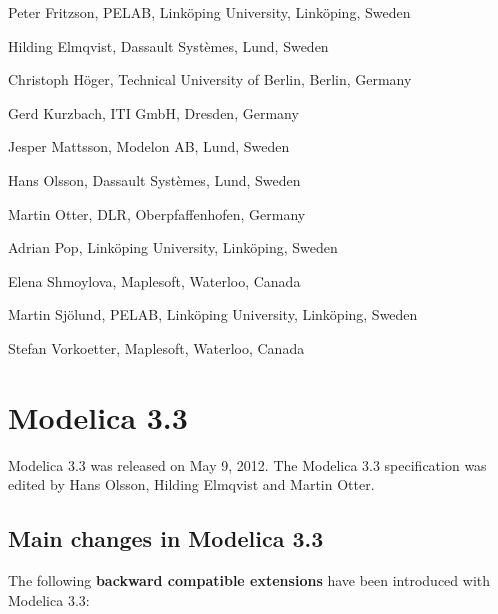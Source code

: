 Peter Fritzson, PELAB, Linköping University, Linköping, Sweden

Hilding Elmqvist, Dassault Systèmes, Lund, Sweden

Christoph Höger, Technical University of Berlin, Berlin, Germany

Gerd Kurzbach, ITI GmbH, Dresden, Germany

Jesper Mattsson, Modelon AB, Lund, Sweden

Hans Olsson, Dassault Systèmes, Lund, Sweden

Martin Otter, DLR, Oberpfaffenhofen, Germany

Adrian Pop, Linköping University, Linköping, Sweden

Elena Shmoylova, Maplesoft, Waterloo, Canada

Martin Sjölund, PELAB, Linköping University, Linköping, Sweden

Stefan Vorkoetter, Maplesoft, Waterloo, Canada

\section{Modelica 3.3}

Modelica 3.3 was released on May 9, 2012. The Modelica 3.3 specification
was edited by Hans Olsson, Hilding Elmqvist and Martin Otter.

\subsection{Main changes in Modelica 3.3}

The following \textbf{backward compatible extensions} have been
introduced with Modelica 3.3:


